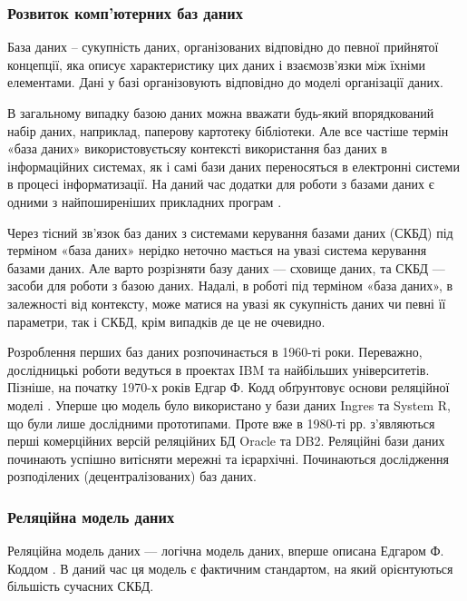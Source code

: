 \subsubsection{Розвиток комп’ютерних баз даних}

База даних – сукупність даних, організованих відповідно до певної прийнятої концепції, яка описує характеристику цих даних і взаємозв'язки між їхніми елементами. Дані у базі організовують відповідно до моделі організації даних. 

В загальному випадку базою даних можна вважати будь-який впорядкований набір даних, наприклад, паперову картотеку бібліотеки. Але все частіше термін «база даних» використовуєтьсяу контексті використання баз даних в інформаційних системах, як і самі бази даних переносяться в електронні системи в процесі інформатизації. На даний час додатки для роботи з базами даних є одними з найпоширеніших прикладних програм \cite{ситник2004проектування}.

Через тісний зв'язок баз даних з системами керування базами даних (СКБД) під терміном «база даних» нерідко неточно мається на увазі система керування базами даних. Але варто розрізняти базу даних — сховище даних, та СКБД — засоби для роботи з базою даних. Надалі, в роботі під терміном «база даних», в залежності від контексту, може матися на увазі як сукупність даних чи певні її параметри, так і СКБД, крім випадків де це не очевидно.

Розроблення перших баз даних розпочинається в 1960-ті роки. Переважно, дослідницькі роботи ведуться в проектах IBM та найбільших університетів. Пізніше, на початку 1970-х років Едгар Ф. Кодд обґрунтовує основи реляційної моделі \cite{codd1970relational}. Уперше цю модель було використано у бази даних Ingres та System R, що були лише дослідними прототипами. Проте вже в 1980-ті рр. з’являються перші комерційних версій реляційних БД Oracle та DB2. Реляційні бази даних починають успішно витісняти мережні та ієрархічні. Починаються дослідження розподілених (децентралізованих) баз даних.

\subsubsection{Реляційна модель даних}\label{subsection:relationModel}

Реляційна модель даних — логічна модель даних, вперше описана Едгаром Ф. Коддом \cite{codd1970relational}. В даний час ця модель є фактичним стандартом, на який орієнтуються більшість сучасних СКБД.

